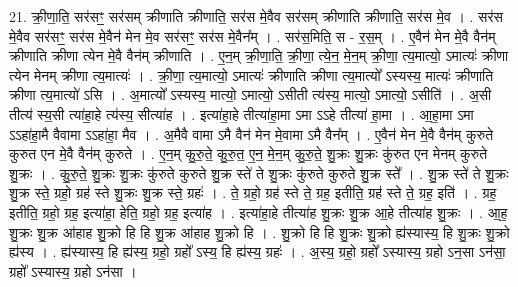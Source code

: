 \documentclass[17pt]{extarticle}
\begin{document}
21. क्री॒णा॒ति॒ सर॑सꣳ॒॒ सर॑सम् क्रीणाति क्रीणाति॒ सर॑स मे॒वैव सर॑सम् क्रीणाति क्रीणाति॒ सर॑स मे॒व । . सर॑स मे॒वैव सर॑सꣳ॒॒ सर॑स मे॒वैन॑ मेन मे॒व सर॑सꣳ॒॒ सर॑स मे॒वैन᳚म् । . सर॑स॒मिति॒ स - र॒स॒म् । . ए॒वैन॑ मेन मे॒वै वैन॑म् क्रीणाति क्रीणा त्येन मे॒वै वैन॑म् क्रीणाति । . ए॒न॒म् क्री॒णा॒ति॒ क्री॒णा॒ त्ये॒न॒ मे॒न॒म् क्री॒णा॒ त्य॒मात्यो॒ ऽमात्यः॑ क्रीणा त्येन मेनम् क्रीणा त्य॒मात्यः॑ । . क्री॒णा॒ त्य॒मात्यो॒ ऽमात्यः॑ क्रीणाति क्रीणा त्य॒मात्यो᳚ ऽस्यस्य॒ मात्यः॑ क्रीणाति क्रीणा त्य॒मात्यो॑ ऽसि । . अ॒मात्यो᳚ ऽस्यस्य॒ मात्यो॒ ऽमात्यो॒ ऽसीती त्य॑स्य॒ मात्यो॒ ऽमात्यो॒ ऽसीति॑ । . अ॒सी तीत्य॑ स्य॒सी त्या॑हा॒हे त्य॑स्य॒ सीत्या॑ह । . इत्या॑हा॒हे तीत्या॑हा॒मा ऽमा ऽऽहे तीत्या॑ हा॒मा । . आ॒हा॒मा ऽमा ऽऽहा॑हा॒मै वैवामा ऽऽहा॑हा॒ मैव । . अ॒मैवै वामा ऽमै वैन॑ मेन मे॒वामा ऽमै वैन᳚म् । . ए॒वैन॑ मेन मे॒वै वैन॑म् कुरुते कुरुत एन मे॒वै वैन॑म् कुरुते । . ए॒न॒म् कु॒रु॒ते॒ कु॒रु॒त॒ ए॒न॒ मे॒न॒म् कु॒रु॒ते॒ शु॒क्रः शु॒क्रः कु॑रुत एन मेनम् कुरुते शु॒क्रः । . कु॒रु॒ते॒ शु॒क्रः शु॒क्रः कु॑रुते कुरुते शु॒क्र स्ते॑ ते शु॒क्रः कु॑रुते कुरुते शु॒क्र स्ते᳚ । . शु॒क्र स्ते॑ ते शु॒क्रः शु॒क्र स्ते॒ ग्रहो॒ ग्रह॑ स्ते शु॒क्रः शु॒क्र स्ते॒ ग्रहः॑ । . ते॒ ग्रहो॒ ग्रह॑ स्ते ते॒ ग्रह॒ इतीति॒ ग्रह॑ स्ते ते॒ ग्रह॒ इति॑ । . ग्रह॒ इतीति॒ ग्रहो॒ ग्रह॒ इत्या॑हा॒ हेति॒ ग्रहो॒ ग्रह॒ इत्या॑ह । . इत्या॑हा॒हे तीत्या॑ह शु॒क्रः शु॒क्र आ॒हे तीत्या॑ह शु॒क्रः । . आ॒ह॒ शु॒क्रः शु॒क्र आ॑हाह शु॒क्रो हि हि शु॒क्र आ॑हाह शु॒क्रो हि । . शु॒क्रो हि हि शु॒क्रः शु॒क्रो ह्य॑स्यास्य॒ हि शु॒क्रः शु॒क्रो ह्य॑स्य । . ह्य॑स्यास्य॒ हि ह्य॑स्य॒ ग्रहो॒ ग्रहो᳚ ऽस्य॒ हि ह्य॑स्य॒ ग्रहः॑ । . अ॒स्य॒ ग्रहो॒ ग्रहो᳚ ऽस्यास्य॒ ग्रहो ऽन॒सा ऽन॑सा॒ ग्रहो᳚ ऽस्यास्य॒ ग्रहो ऽन॑सा । \newline
\end{document}
